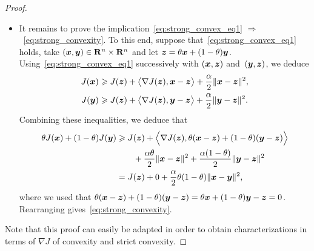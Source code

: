 \begin{proof}
\begin{itemize}
    \item
        It remains to prove the implication~\eqref{eq:strong_convex_eq1} $\Rightarrow$~\eqref{eq:strong_convexity}.
        To this end, suppose that~\eqref{eq:strong_convex_eq1} holds,
        take $(\vect x, \vect y) \in \real^n \times \real^n$
        and let $\vect z = \theta \vect x + (1 - \theta) \vect y$.
        Using~\eqref{eq:strong_convex_eq1} successively with $(\vect x, \vect z)$ and~$(\vect y, \vect z)$,
        we deduce
        \begin{align*}
            J(\vect x) &\geq J(\vect z) + \ip[\big]{\nabla J(\vect z), \vect x - \vect z} + \frac{\alpha}{2} \norm{\vect x - \vect z}^2, \\
            J(\vect y) &\geq J(\vect z) + \ip[\big]{\nabla J(\vect z), \vect y - \vect z} + \frac{\alpha}{2} \norm{\vect y - \vect z}^2.
        \end{align*}
        Combining these inequalities,
        we deduce that
        \begin{align*}
            \theta J(\vect x) + (1 - \theta) J(\vect y)
            &\geq J(\vect z) + \ip[\Big]{\nabla J(\vect z), \theta(\vect x - \vect z) + (1 - \theta) (\vect y - \vect z)} \\
            &\qquad + \frac{\alpha \theta}{2} \norm{\vect x - \vect z}^2 + \frac{\alpha(1 - \theta)}{2}  \norm{\vect y - \vect z}^2 \\
            &= J(\vect z) + 0 + \frac{\alpha}{2} \theta (1-\theta) \norm{\vect x - \vect y}^2,
        \end{align*}
        where we used that $\theta(\vect x - \vect z) + (1 - \theta) (\vect y - \vect z) = \theta \vect x + (1 - \theta) \vect y - \vect z = 0$.
        Rearranging gives~\eqref{eq:strong_convexity}.
    \end{itemize}
    Note that this proof can easily be adapted in order to obtain characterizations in terms of $\nabla J$ of convexity and strict convexity.
\end{proof}

